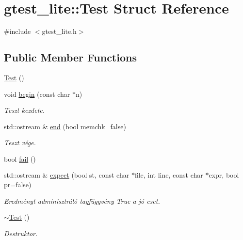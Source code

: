\hypertarget{structgtest__lite_1_1_test}{}\section{gtest\+\_\+lite\+:\+:Test Struct Reference}
\label{structgtest__lite_1_1_test}


{\ttfamily \#include $<$gtest\+\_\+lite.\+h$>$}

\subsection*{Public Member Functions}
\begin{DoxyCompactItemize}
\item 
\hyperlink{structgtest__lite_1_1_test_a99fb3f2338e4e0512beb6e19c5409078}{Test} ()
\item 
void \hyperlink{structgtest__lite_1_1_test_a2227b70fcc5dfb3c326bf117dd8f7e79}{begin} (const char $\ast$n)
\begin{DoxyCompactList}\small\item\em Teszt kezdete. \end{DoxyCompactList}\item 
std\+::ostream \& \hyperlink{structgtest__lite_1_1_test_a658c1eee35f170294c354ebf4d3fc1ba}{end} (bool memchk=false)
\begin{DoxyCompactList}\small\item\em Teszt vége. \end{DoxyCompactList}\item 
bool \hyperlink{structgtest__lite_1_1_test_aadbfd0f53c56d975f793602996631195}{fail} ()
\item 
std\+::ostream \& \hyperlink{structgtest__lite_1_1_test_a0bca03315e5963f7fdfffd92d2daed6a}{expect} (bool st, const char $\ast$file, int line, const char $\ast$expr, bool pr=false)
\begin{DoxyCompactList}\small\item\em Eredményt adminisztráló tagfüggvény True a jó eset. \end{DoxyCompactList}\item 
\hyperlink{structgtest__lite_1_1_test_a5a879233c2aa110626668c06140f6e71}{$\sim$\+Test} ()
\begin{DoxyCompactList}\small\item\em Destruktor. \end{DoxyCompactList}\end{DoxyCompactItemize}
